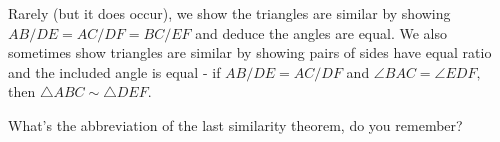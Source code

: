 Rarely (but it does occur), we show the triangles are similar by showing $AB/DE = AC/DF = BC/EF$ and deduce the angles are equal. We also sometimes show triangles are similar by showing pairs of sides have equal ratio and the included angle is equal - if $AB/DE = AC/DF$ and $\angle BAC = \angle EDF,$ then $\triangle ABC \sim \triangle DEF.$

What's the abbreviation of the last similarity theorem, do you remember?





















